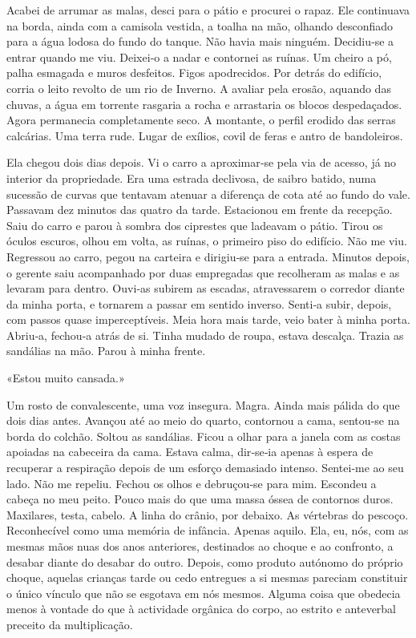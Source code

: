 Acabei de arrumar as malas, desci para o pátio e procurei o rapaz. Ele
continuava na borda, ainda com a camisola vestida, a toalha na mão,
olhando desconfiado para a água lodosa do fundo do tanque. Não havia
mais ninguém. Decidiu­‑se a entrar quando me viu. Deixei­‑o a nadar e
contornei as ruínas. Um cheiro a pó, palha esmagada e muros desfeitos.
Figos apodrecidos. Por detrás do edifício, corria o leito revolto de um
rio de Inverno. A avaliar pela erosão, aquando das chuvas, a água em
torrente rasgaria a rocha e arrastaria os blocos despedaçados. Agora
permanecia completamente seco. A montante, o perfil erodido das serras
calcárias. Uma terra rude. Lugar de exílios, covil de feras e antro de
bandoleiros.

Ela chegou dois dias depois. Vi o carro a aproximar­‑se pela via de
acesso, já no interior da propriedade. Era uma estrada declivosa, de
saibro batido, numa sucessão de curvas que tentavam atenuar a diferença
de cota até ao fundo do vale. Passavam dez minutos das quatro da tarde.
Estacionou em frente da recepção. Saiu do carro e parou à sombra dos
ciprestes que ladeavam o pátio. Tirou os óculos escuros, olhou em volta,
as ruínas, o primeiro piso do edifício. Não me viu. Regressou ao carro,
pegou na carteira e dirigiu­‑se para a entrada. Minutos depois, o
gerente saiu acompanhado por duas empregadas que recolheram as malas e
as levaram para dentro. Ouvi­‑as subirem as escadas, atravessarem o
corredor diante da minha porta, e tornarem a passar em sentido inverso.
Senti­‑a subir, depois, com passos quase imperceptíveis. Meia hora mais
tarde, veio bater à minha porta. Abriu­‑a, fechou­‑a atrás de si. Tinha
mudado de roupa, estava descalça. Trazia as sandálias na mão. Parou à
minha frente.

«Estou muito cansada.»

Um rosto de convalescente, uma voz insegura. Magra. Ainda mais pálida do
que dois dias antes. Avançou até ao meio do quarto, contornou a cama,
sentou­‑se na borda do colchão. Soltou as sandálias. Ficou a olhar para
a janela com as costas apoiadas na cabeceira da cama. Estava calma,
dir­‑se­‑ia apenas à espera de recuperar a respiração depois de um
esforço demasiado intenso. Sentei­‑me ao seu lado. Não me repeliu.
Fechou os olhos e debruçou­‑se para mim. Escondeu a cabeça no meu peito.
Pouco mais do que uma massa óssea de contornos duros. Maxilares, testa,
cabelo. A linha do crânio, por debaixo. As vértebras do pescoço.
Reconhecível como uma memória de infância. Apenas aquilo. Ela, eu, nós,
com as mesmas mãos nuas dos anos anteriores, destinados ao choque e ao
confronto, a desabar diante do desabar do outro. Depois, como produto
autónomo do próprio choque, aquelas crianças tarde ou cedo entregues a
si mesmas pareciam constituir o único vínculo que não se esgotava em nós
mesmos. Alguma coisa que obedecia menos à vontade do que à actividade
orgânica do corpo, ao estrito e anteverbal preceito da multiplicação.

